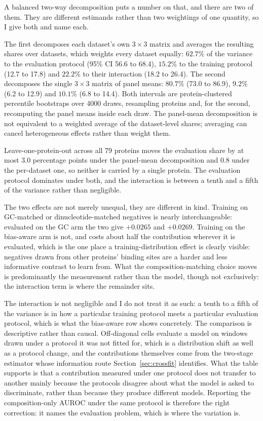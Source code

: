 A balanced two-way decomposition puts a number on that, and there are two of them. They are
different estimands rather than two weightings of one quantity, so I give both and name each.

The first decomposes each dataset's own $3\times3$ matrix and averages the resulting shares over
datasets, which weights every dataset equally: $62.7\%$ of the variance to the evaluation
protocol (95\% CI 56.6 to 68.4), $15.2\%$ to the training protocol (12.7 to 17.8) and $22.2\%$
to their interaction (18.2 to 26.4). The second decomposes the single $3\times3$ matrix of panel
means: $80.7\%$ (73.0 to 86.9), $9.2\%$ (6.2 to 12.9) and $10.1\%$ (6.8 to 14.4). Both intervals
are protein-clustered percentile bootstraps over 4000 draws, resampling proteins and, for the
second, recomputing the panel means inside each draw. The panel-mean decomposition is not
equivalent to a weighted average of the dataset-level shares; averaging can cancel
heterogeneous effects rather than weight them.

Leave-one-protein-out across all 79 proteins moves the evaluation share by at most $3.0$
percentage points under the panel-mean decomposition and $0.8$ under the per-dataset one, so
neither is carried by a single protein. The evaluation protocol dominates under both, and the
interaction is between a tenth and a fifth of the variance rather than negligible.

The two effects are not merely unequal, they are different in kind. Training on GC-matched or
dinucleotide-matched negatives is nearly interchangeable: evaluated on the GC arm the two give
$+0.0265$ and $+0.0269$. Training on the bias-aware arm is not, and costs about half the
contribution wherever it is evaluated, which is the one place a training-distribution effect is
clearly visible: negatives drawn from other proteins' binding sites are a harder and less
informative contrast to learn from. What the composition-matching choice moves is
predominantly the measurement rather than the model, though not exclusively: the interaction
term is where the remainder sits.

The interaction is not negligible and I do not treat it as such: a tenth to a fifth of the
variance is in how a particular training protocol meets a particular evaluation protocol, which
is what the bias-aware row shows concretely. The comparison is descriptive rather than causal. Off-diagonal
cells evaluate a model on windows drawn under a protocol it was not fitted for, which is a
distribution shift as well as a protocol change, and the contributions themselves come from the
two-stage estimator whose information route Section~\ref{sec:crossfit} identifies. What the
table supports is that a contribution measured under one protocol does not transfer to another
mainly because the protocols disagree about what the model is asked to discriminate, rather
than because they produce different models. Reporting the composition-only AUROC
under the same protocol is therefore the right correction: it names the evaluation problem,
which is where the variation is.

